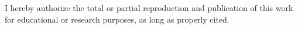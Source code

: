 \newpage
\begin{center}
  \begin{minipage}{12cm}
    \vspace{5em}

    I hereby authorize the total or partial reproduction and publication of this work for educational or research purposes, as long as properly cited.
  \end{minipage}
\end{center}
